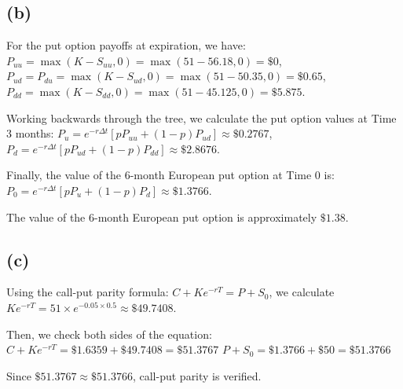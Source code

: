 \subsection{(b)}\label{b}

For the put option payoffs at expiration, we have:
\(P_{uu} = \max(K - S_{uu}, 0) = \max(51 - 56.18, 0) = \$0\),
\(P_{ud} = P_{du} = \max(K - S_{ud}, 0) = \max(51 - 50.35, 0) = \$0.65\),
\(P_{dd} = \max(K - S_{dd}, 0) = \max(51 - 45.125, 0) = \$5.875\).

Working backwards through the tree, we calculate the put option values
at Time 3 months:
\(P_u = e^{-r\Delta t} [p P_{uu} + (1-p) P_{ud}] \approx \$0.2767\),
\(P_d = e^{-r\Delta t} [p P_{ud} + (1-p) P_{dd}] \approx \$2.8676\).

Finally, the value of the 6-month European put option at Time 0 is:
\(P_0 = e^{-r\Delta t} [p P_u + (1-p) P_d] \approx \$1.3766\).

The value of the 6-month European put option is approximately
\(\boxed{\$1.38}\).

\subsection{(c)}\label{c}

Using the call-put parity formula: \(C + Ke^{-rT} = P + S_0\), we
calculate
\(Ke^{-rT} = 51 \times e^{-0.05 \times 0.5} \approx \$49.7408\).

Then, we check both sides of the equation:
\(C + Ke^{-rT} = \$1.6359 + \$49.7408 = \$51.3767\)
\(P + S_0 = \$1.3766 + \$50 = \$51.3766\)

Since \(\$51.3767 \approx \$51.3766\), call-put parity is verified.
